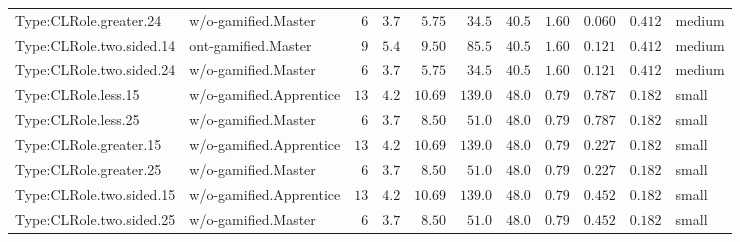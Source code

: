\documentclass[6pt,a4paper]{article}
\begin{document}
{\begin{longtable}{llrrrrrrrrl}
Type:CLRole.greater.24&w/o-gamified.Master&$ 6$&$3.7$&$ 5.75$&$ 34.5$&$ 40.5$&$ 1.60$&$0.060$&$0.412$&medium\tabularnewline
Type:CLRole.two.sided.14&ont-gamified.Master&$ 9$&$5.4$&$ 9.50$&$ 85.5$&$ 40.5$&$ 1.60$&$0.121$&$0.412$&medium\tabularnewline
Type:CLRole.two.sided.24&w/o-gamified.Master&$ 6$&$3.7$&$ 5.75$&$ 34.5$&$ 40.5$&$ 1.60$&$0.121$&$0.412$&medium\tabularnewline
Type:CLRole.less.15&w/o-gamified.Apprentice&$13$&$4.2$&$10.69$&$139.0$&$ 48.0$&$ 0.79$&$0.787$&$0.182$&small\tabularnewline
Type:CLRole.less.25&w/o-gamified.Master&$ 6$&$3.7$&$ 8.50$&$ 51.0$&$ 48.0$&$ 0.79$&$0.787$&$0.182$&small\tabularnewline
Type:CLRole.greater.15&w/o-gamified.Apprentice&$13$&$4.2$&$10.69$&$139.0$&$ 48.0$&$ 0.79$&$0.227$&$0.182$&small\tabularnewline
Type:CLRole.greater.25&w/o-gamified.Master&$ 6$&$3.7$&$ 8.50$&$ 51.0$&$ 48.0$&$ 0.79$&$0.227$&$0.182$&small\tabularnewline
\newpage
Type:CLRole.two.sided.15&w/o-gamified.Apprentice&$13$&$4.2$&$10.69$&$139.0$&$ 48.0$&$ 0.79$&$0.452$&$0.182$&small\tabularnewline
Type:CLRole.two.sided.25&w/o-gamified.Master&$ 6$&$3.7$&$ 8.50$&$ 51.0$&$ 48.0$&$ 0.79$&$0.452$&$0.182$&small\tabularnewline
\hline
\end{longtable}}
\end{document}
